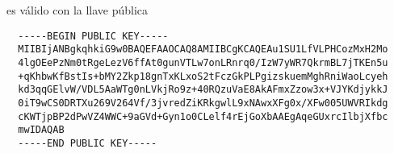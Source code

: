 es válido con la llave pública

\begin{verbatim}
  -----BEGIN PUBLIC KEY-----
  MIIBIjANBgkqhkiG9w0BAQEFAAOCAQ8AMIIBCgKCAQEAu1SU1LfVLPHCozMxH2Mo
  4lgOEePzNm0tRgeLezV6ffAt0gunVTLw7onLRnrq0/IzW7yWR7QkrmBL7jTKEn5u
  +qKhbwKfBstIs+bMY2Zkp18gnTxKLxoS2tFczGkPLPgizskuemMghRniWaoLcyeh
  kd3qqGElvW/VDL5AaWTg0nLVkjRo9z+40RQzuVaE8AkAFmxZzow3x+VJYKdjykkJ
  0iT9wCS0DRTXu269V264Vf/3jvredZiKRkgwlL9xNAwxXFg0x/XFw005UWVRIkdg
  cKWTjpBP2dPwVZ4WWC+9aGVd+Gyn1o0CLelf4rEjGoXbAAEgAqeGUxrcIlbjXfbc
  mwIDAQAB
  -----END PUBLIC KEY----- 
\end{verbatim}

